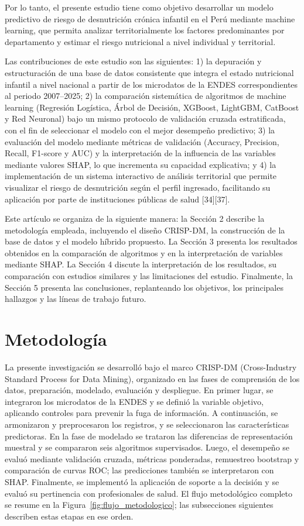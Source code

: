 \documentclass[final,5p,times,twocolumn,authoryear,lefttitle]{elsarticle}
\begin{document}
Por lo tanto, el presente estudio tiene como objetivo desarrollar un modelo predictivo de riesgo de desnutrición crónica infantil en el Perú mediante machine learning, que permita analizar territorialmente los factores predominantes por departamento y estimar el riesgo nutricional a nivel individual y territorial.

Las contribuciones de este estudio son las siguientes: 1) la depuración y estructuración de una base de datos consistente que integra el estado nutricional infantil a nivel nacional a partir de los microdatos de la ENDES correspondientes al periodo 2007--2025; 2) la comparación sistemática de algoritmos de machine learning (Regresión Logística, Árbol de Decisión, XGBoost, LightGBM, CatBoost y Red Neuronal) bajo un mismo protocolo de validación cruzada estratificada, con el fin de seleccionar el modelo con el mejor desempeño predictivo; 3) la evaluación del modelo mediante métricas de validación (Accuracy, Precision, Recall, F1-score y AUC) y la interpretación de la influencia de las variables mediante valores SHAP, lo que incrementa su capacidad explicativa; y 4) la implementación de un sistema interactivo de análisis territorial que permite visualizar el riesgo de desnutrición según el perfil ingresado, facilitando su aplicación por parte de instituciones públicas de salud [34][37].

Este artículo se organiza de la siguiente manera: la Sección 2 describe la metodología empleada, incluyendo el diseño CRISP-DM, la construcción de la base de datos y el modelo híbrido propuesto. La Sección 3 presenta los resultados obtenidos en la comparación de algoritmos y en la interpretación de variables mediante SHAP. La Sección 4 discute la interpretación de los resultados, su comparación con estudios similares y las limitaciones del estudio. Finalmente, la Sección 5 presenta las conclusiones, replanteando los objetivos, los principales hallazgos y las líneas de trabajo futuro.

\section{Metodología}
\label{metodologia}

La presente investigación se desarrolló bajo el marco CRISP-DM (Cross-Industry Standard Process for Data Mining), organizado en las fases de comprensión de los datos, preparación, modelado, evaluación y despliegue. En primer lugar, se integraron los microdatos de la ENDES y se definió la variable objetivo, aplicando controles para prevenir la fuga de información. A continuación, se armonizaron y preprocesaron los registros, y se seleccionaron las características predictoras. En la fase de modelado se trataron las diferencias de representación muestral y se compararon seis algoritmos supervisados. Luego, el desempeño se evaluó mediante validación cruzada, métricas ponderadas, remuestreo bootstrap y comparación de curvas ROC; las predicciones también se interpretaron con SHAP. Finalmente, se implementó la aplicación de soporte a la decisión y se evaluó su pertinencia con profesionales de salud. El flujo metodológico completo se resume en la Figura~\ref{fig:flujo_metodologico}; las subsecciones siguientes describen estas etapas en ese orden.
\end{document}
